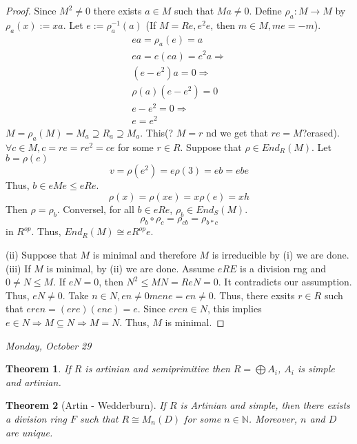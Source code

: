 \documentclass[letterpaper, leqno, 12pt]{article}
\newcommand{\bN}{\mathbb{N}}
\theoremstyle{stdthm}
\newtheorem{thm}{Theorem}
\theoremstyle{stddef}
\theoremstyle{stdnonum}
\theoremstyle{stdqands}
\theoremstyle{stdbold}
\begin{document}
\begin{proof}
Since $M^2 \neq 0$ there exists $a \in M$ such that $Ma \neq 0$. Define $\rho_a: M \rightarrow M$ by $\rho_a(x) := xa$. Let $e:= \rho_a^{-1}(a)$ (If $M = Re, e^2 e$, then $ m \in M, me=- m$). 
\begin{align*}
ea = \rho_a(e) = a\\
ea = e(ea) = e^2a \Rightarrow\\
(e-e^2)a = 0\Rightarrow\\
\rho(a)(e-e^2) = 0\\
e - e^2 = 0 \Rightarrow\\
e = e^2
\end{align*}
$M = \rho_a(M) = M_a \supseteq R_a \supseteq M_a$. This(? $M=r$ nd we get that $re = M$?erased). $\forall c \in M, c = re = re^2 = ce$ for some $ r \in R$. Suppose that $\rho \in End_R(M)$. Let $b = \rho(e)$
\[ v = \rho(e^2) =e \rho(3) = eb = ebe \]
Thus, $b \in eMe \leq eRe$. 
\[ \rho(x) = \rho(xe) = x \rho(e) = xh \] 
Then $\rho = \rho_b$. Conversel, for all $b \in eRe$, $\rho_b \in End_S(M)$. 
\[ \rho_b \circ \rho_c = \rho_{cb} = \rho_{b*c} \] in $R^{op}$. Thus, $End_R(M) \cong eR^{op}e$. 

(ii) Suppose that $M$ is minimal and therefore $M$ is irreducible by (i) we are done. \\

(iii) If $M$ is minimal, by (ii) we are done. Assume $eRE$ is a division rng and $0 \neq N \leq M$. If $eN = 0$, then $N^2 \leq MN = ReN = 0$. It contradicts our assumption. Thus, $eN \neq 0$. Take $n \in N, en\neq 0m ene = en \neq 0$. Thus, there exsits $r \in R$ such that $eren = (ere)(ene) = e$. Since $eren \in N$, this implies $e \in N \Rightarrow M \subseteq N \Rightarrow M = N$. Thus, $M$ is minimal. 
\end{proof}

\begin{center}
\emph{Monday, October 29}
\end{center}

\begin{thm}
If $R$ is artinian and semiprimitive then $R = \bigoplus A_i$, $A_i$ is simple and artinian. 
\end{thm}

\begin{thm} [Artin - Wedderburn]
If $R$ is Artinian and simple, then there exists a division ring $F$ such that $R \cong M_n(D)$ for some $n \in \bN$. Moreover, $n$ and $D$ are unique. 
\end{thm}
\end{document}
